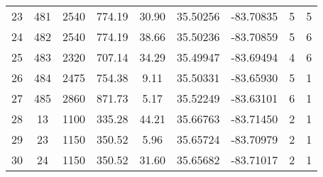 \begin{table}[p]
\begin{flushleft}
\begin{tabular}{ccccccccc}
23 & 481                                                 & 2540                                                          & 774.19                                                       & 30.90 & 35.50256 & -83.70835 & 5                                                                                      & 5 \\ 
24 & 482                                                 & 2540                                                          & 774.19                                                       & 38.66 & 35.50236 & -83.70859 & 5                                                                                      & 6 \\ 
25 & 483                                                 & 2320                                                          & 707.14                                                       & 34.29 & 35.49947 & -83.69494 & 4                                                                                      & 6 \\ 
26 & 484                                                 & 2475                                                          & 754.38                                                       & 9.11   & 35.50331 & -83.65930 & 5                                                                                      & 1 \\ 
27 & 485                                                 & 2860                                                          & 871.73                                                       & 5.17   & 35.52249 & -83.63101 & 6                                                                                      & 1 \\ 
28 & 13                                                   & 1100                                                          & 335.28                                                       & 44.21 & 35.66763 & -83.71450 & 2                                                                                      & 1 \\ 
29 & 23                                                   & 1150                                                          & 350.52                                                       & 5.96   & 35.65724 & -83.70979 & 2                                                                                      & 1 \\ 
30 & 24                                                   & 1150                                                          & 350.52                                                       & 31.60 & 35.65682 & -83.71017 & 2                                                                                      & 1 \\ 

\end{tabular}
\end{flushleft}
\end{table}
